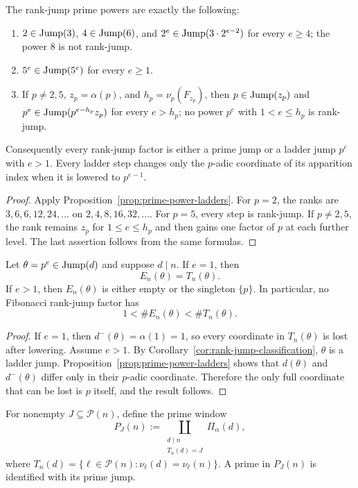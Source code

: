 \begin{corollary}
\label{cor:rank-jump-classification}
The rank-jump prime powers are exactly the following:
\begin{enumerate}[label=(\roman*)]
\item $2\in\operatorname{Jump}(3)$, $4\in\operatorname{Jump}(6)$, and
$2^e\in\operatorname{Jump}(3\cdot2^{e-2})$ for every $e\ge4$; the power $8$ is not
rank-jump.
\item $5^e\in\operatorname{Jump}(5^e)$ for every $e\ge1$.
\item If $p\ne2,5$, $z_p=\alpha(p)$, and
$h_p=\nu_p(F_{z_p})$, then $p\in\operatorname{Jump}(z_p)$ and
$p^e\in\operatorname{Jump}(p^{e-h_p}z_p)$ for every $e>h_p$; no power $p^e$ with
$1<e\le h_p$ is rank-jump.
\end{enumerate}
Consequently every rank-jump factor is either a prime jump or a ladder jump $p^e$ with
$e>1$. Every ladder step changes only the $p$-adic coordinate of its
apparition index when it is lowered to $p^{e-1}$.
\end{corollary}

\begin{proof}
Apply Proposition~\ref{prop:prime-power-ladders}. For $p=2$, the ranks are
$3,6,6,12,24,\ldots$ on $2,4,8,16,32,\ldots$. For $p=5$, every step is
rank-jump. If $p\ne2,5$, the rank remains $z_p$ for $1\le e\le h_p$ and then
gains one factor of $p$ at each further level. The last assertion follows
from the same formulas.
\end{proof}

\begin{lemma}
\label{thm:primitive-ladder-dichotomy}
Let $\theta=p^e\in\operatorname{Jump}(d)$ and suppose $d\mid n$. If $e=1$, then
\[
E_n(\theta)=T_n(\theta).
\]
If $e>1$, then $E_n(\theta)$ is either empty or the singleton $\{p\}$.
In particular, no Fibonacci rank-jump factor has
\[
1<\#E_n(\theta)<\#T_n(\theta).
\]
\end{lemma}

\begin{proof}
If $e=1$, then $d^-(\theta)=\alpha(1)=1$, so every coordinate in
$T_n(\theta)$ is lost after lowering. Assume $e>1$. By
Corollary~\ref{cor:rank-jump-classification}, $\theta$ is a ladder jump.
Proposition~\ref{prop:prime-power-ladders} shows that $d(\theta)$ and
$d^-(\theta)$ differ only in their $p$-adic coordinate. Therefore the only
full coordinate that can be lost is $p$ itself, and the result follows.
\end{proof}

For nonempty $J\subseteq\mathcal P(n)$, define the prime window
\[
P_J(n):=\coprod_{\substack{d\mid n\\T_n(d)=J}}\Pi_\alpha(d),
\]
where $T_n(d)=\{\ell\in\mathcal P(n):
\nu_\ell(d)=\nu_\ell(n)\}$.  A prime in $P_J(n)$ is identified with its
prime jump.

